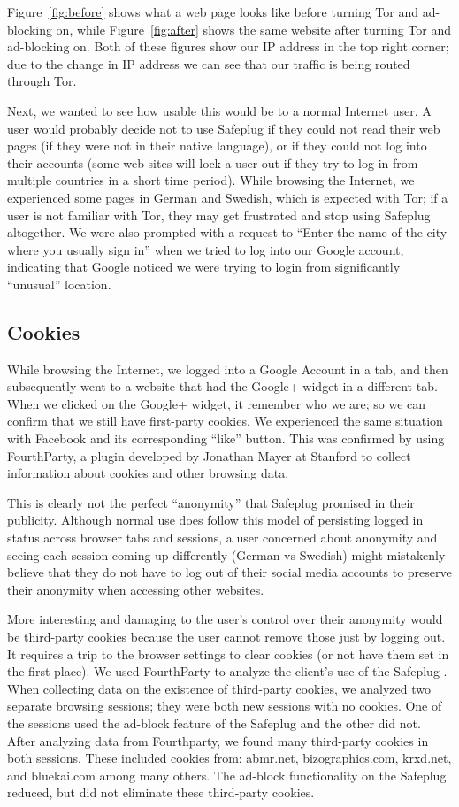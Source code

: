\documentclass[conference]{IEEEtran}
\begin{document}
Figure~\ref{fig:before} shows what a web page looks like before turning Tor and ad-blocking on, while Figure~\ref{fig:after} shows the same website after turning Tor and ad-blocking on.  Both of these figures show our IP address in the top right corner; due to the change in IP address we can see that our traffic is being routed through Tor.  

Next, we wanted to see how usable this would be to a normal Internet user.  A user would probably decide not to use Safeplug if they could not read their web pages (if they were not in their native language), or if they could not log into their accounts (some web sites will lock a user out if they try to log in from multiple countries in a short time period).  While browsing the Internet, we experienced some pages in German and Swedish, which is expected with Tor; if a user is not familiar with Tor, they may get frustrated and stop using Safeplug altogether.  We were also prompted with a request to ``Enter the name of the city where you usually sign in'' when we tried to log into our Google account, indicating that Google noticed we were trying to login from significantly ``unusual'' location.

\subsection{Cookies}  
While browsing the Internet, we logged into a Google Account in a tab, and then subsequently went to a website that had the Google+ widget in a different tab.  When we clicked on the Google+ widget, it remember who we are; so we can confirm that we still have first-party cookies.  We experienced the same situation with Facebook and its corresponding ``like'' button.  This was confirmed by using FourthParty, a plugin developed by Jonathan Mayer at Stanford to collect information about cookies and other browsing data.

This is clearly not the perfect ``anonymity'' that Safeplug promised in their publicity.  Although normal use does follow this model of persisting logged in status across browser tabs and sessions, a user concerned about anonymity and seeing each session coming up differently (German vs Swedish) might mistakenly believe that they do not have to log out of their social media accounts to preserve their anonymity when accessing other websites.

More interesting and damaging to the user's control over their anonymity would be third-party cookies because the user cannot remove those just by logging out.  It requires a trip to the browser settings to clear cookies (or not have them set in the first place).  We used FourthParty to analyze the client's use of the Safeplug \cite{fourthparty}.  When collecting data on the existence of third-party cookies, we analyzed two separate browsing sessions; they were both new sessions with no cookies.  One of the sessions used the ad-block feature of the Safeplug and the other did not.  After analyzing data from Fourthparty, we found many third-party cookies in both sessions.  These included cookies from: abmr.net, bizographics.com, krxd.net, and bluekai.com among many others.  The ad-block functionality on the Safeplug reduced, but did not eliminate these third-party cookies.
\end{document}
